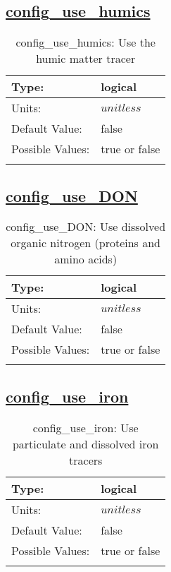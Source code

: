 \subsection[config\_use\_humics]{\hyperref[sec:nm_tab_biogeochemistry]{config\_use\_humics}}
\label{subsec:nm_sec_config_use_humics}
\begin{center}
\begin{longtable}{| p{2.0in} || p{4.0in} |}
    \hline
    Type: & logical \\
    \hline
    Units: & $unitless$ \\
    \hline
    Default Value: & false \\
    \hline
    Possible Values: & true or false \\
    \hline
    \caption{config\_use\_humics: Use the humic matter tracer}
\end{longtable}
\end{center}
\subsection[config\_use\_DON]{\hyperref[sec:nm_tab_biogeochemistry]{config\_use\_DON}}
\label{subsec:nm_sec_config_use_DON}
\begin{center}
\begin{longtable}{| p{2.0in} || p{4.0in} |}
    \hline
    Type: & logical \\
    \hline
    Units: & $unitless$ \\
    \hline
    Default Value: & false \\
    \hline
    Possible Values: & true or false \\
    \hline
    \caption{config\_use\_DON: Use dissolved organic nitrogen (proteins and amino acids)}
\end{longtable}
\end{center}
\subsection[config\_use\_iron]{\hyperref[sec:nm_tab_biogeochemistry]{config\_use\_iron}}
\label{subsec:nm_sec_config_use_iron}
\begin{center}
\begin{longtable}{| p{2.0in} || p{4.0in} |}
    \hline
    Type: & logical \\
    \hline
    Units: & $unitless$ \\
    \hline
    Default Value: & false \\
    \hline
    Possible Values: & true or false \\
    \hline
    \caption{config\_use\_iron: Use particulate and dissolved iron tracers}
\end{longtable}
\end{center}

